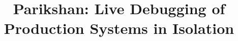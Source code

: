\documentclass{sig-alternate}
\begin{document}

\title{\Large \bf Parikshan\xspace: Live Debugging of Production Systems in Isolation}

%
\maketitle



\newcommand{\iprobe}{\texttt{iProbe}\xspace}
\newcommand{\parikshan}{\texttt{Parikshan}\xspace}
\newcommand{\comment}[1]{}
\newtheorem{example}{Example}
\def\infinity{\rotatebox{90}{8}}



%
%


%
%




%



%
%

\footnotesize{


}

\end{document}
